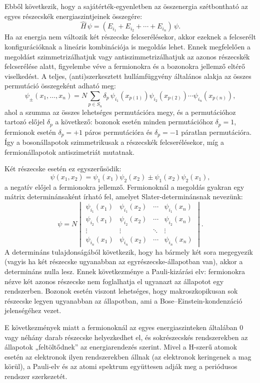 \documentclass[../main.tex]{subfiles}
\begin{document}
Ebből következik, hogy a sajátérték-egyenletben az összenergia szétbontható az egyes részecskék energiaszintjeinek összegére:
\[
\hat{H}\,\psi = (E_{i_1}+E_{i_2}+\cdots+E_{i_n})\,\psi.
\]
Ha az energia nem változik két részecske felcserélésekor, akkor ezeknek a felcserélt konfigurációknak a lineáris kombinációja is megoldás lehet. Ennek megfelelően a megoldást szimmetrizálhatjuk vagy antiszimmetrizálhatjuk az azonos részecskék felcserélése alatt, figyelembe véve a fermionokra és a bozonokra jellemző eltérő viselkedést. A teljes, (anti)szerkesztett hullámfüggvény általános alakja az összes permutáció összegeként adható meg:
\[
\psi_{\pm}(x_1,\dots,x_n)=N\sum_{p\in S_n}\delta_p\,
\psi_{i_1}(x_{p(1)})\psi_{i_2}(x_{p(2)})\cdots\psi_{i_n}(x_{p(n)}),
\]
ahol a szumma az összes lehetséges permutációra megy, és a permutációhoz tartozó előjel $\delta_p$ a következő: bozonok esetén minden permutációhoz $\delta_p=1$, fermionok esetén $\delta_p=+1$ páros permutációra és $\delta_p=-1$ páratlan permutációra. Így a bosonállapotok szimmetrikusak a részecskék felcserélésekor, míg a fermionállapotok antiszimetriát mutatnak.

Két részecske esetén ez egyszerűsödik:
\[
\psi(x_1,x_2)=\psi_1(x_1)\psi_2(x_2)\pm\psi_1(x_2)\psi_2(x_1),
\]
a negatív előjel a fermionokra jellemző. Fermionoknál a megoldás gyakran egy mátrix determinánsaként írható fel, amelyet Slater-determinánsnak nevezünk:
\[
\psi = N
\begin{vmatrix}
\psi_{i_1}(x_1) & \psi_{i_1}(x_2) & \cdots & \psi_{i_1}(x_n) \\
\psi_{i_2}(x_1) & \psi_{i_2}(x_2) & \cdots & \psi_{i_2}(x_n) \\
\vdots & \vdots & \ddots & \vdots \\
\psi_{i_n}(x_1) & \psi_{i_n}(x_2) & \cdots & \psi_{i_n}(x_n)
\end{vmatrix}.
\]
A determináns tulajdonságából következik, hogy ha bármely két sora megegyezik (vagyis ha két részecske ugyanabban az egyrészecske-állapotban van), akkor a determináns nulla lesz. Ennek következménye a Pauli‑kizárási elv: fermionokra nézve két azonos részecske nem foglalhatja el ugyanazt az állapotot egy rendszerben. Bozonok esetén viszont lehetséges, hogy makroszkopikusan sok részecske legyen ugyanabban az állapotban, ami a Bose–Einstein-kondenzáció jelenségéhez vezet.

E következmények miatt a fermionoknál az egyes energiaszinteken általában 0 vagy néhány darab részecske helyezkedhet el, és sokrészecskés rendszerekben az állapotok „feltöltődnek” az energiarendezés szerint. Mivel a H-szerű atomok esetén az elektronok ilyen rendszerekben állnak (az elektronok keringenek a mag körül), a Pauli‑elv és az atomi spektrum együttesen adják meg a periódusos rendszer szerkezetét.
\end{document}
